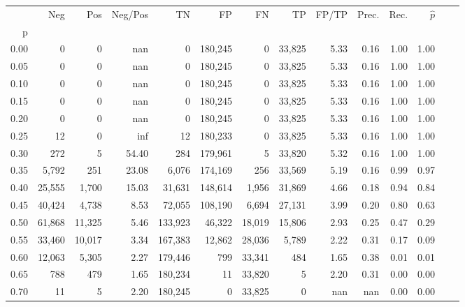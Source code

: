 \begin{tabular}{rrrrrrrrrrrrrr}
\toprule
{} &     Neg &     Pos & Neg/Pos &       TN &       FP &      FN &      TP & FP/TP & Prec. &  Rec. & $\hat{p}$ \\
p    &         &         &         &          &          &         &         &       &       &       &           \\
\midrule
0.00 &       0 &       0 &     nan &        0 &  180,245 &       0 &  33,825 &  5.33 &  0.16 &  1.00 &      1.00 \\
0.05 &       0 &       0 &     nan &        0 &  180,245 &       0 &  33,825 &  5.33 &  0.16 &  1.00 &      1.00 \\
0.10 &       0 &       0 &     nan &        0 &  180,245 &       0 &  33,825 &  5.33 &  0.16 &  1.00 &      1.00 \\
0.15 &       0 &       0 &     nan &        0 &  180,245 &       0 &  33,825 &  5.33 &  0.16 &  1.00 &      1.00 \\
0.20 &       0 &       0 &     nan &        0 &  180,245 &       0 &  33,825 &  5.33 &  0.16 &  1.00 &      1.00 \\
0.25 &      12 &       0 &     inf &       12 &  180,233 &       0 &  33,825 &  5.33 &  0.16 &  1.00 &      1.00 \\
0.30 &     272 &       5 &   54.40 &      284 &  179,961 &       5 &  33,820 &  5.32 &  0.16 &  1.00 &      1.00 \\
0.35 &   5,792 &     251 &   23.08 &    6,076 &  174,169 &     256 &  33,569 &  5.19 &  0.16 &  0.99 &      0.97 \\
0.40 &  25,555 &   1,700 &   15.03 &   31,631 &  148,614 &   1,956 &  31,869 &  4.66 &  0.18 &  0.94 &      0.84 \\
0.45 &  40,424 &   4,738 &    8.53 &   72,055 &  108,190 &   6,694 &  27,131 &  3.99 &  0.20 &  0.80 &      0.63 \\
0.50 &  61,868 &  11,325 &    5.46 &  133,923 &   46,322 &  18,019 &  15,806 &  2.93 &  0.25 &  0.47 &      0.29 \\
0.55 &  33,460 &  10,017 &    3.34 &  167,383 &   12,862 &  28,036 &   5,789 &  2.22 &  0.31 &  0.17 &      0.09 \\
0.60 &  12,063 &   5,305 &    2.27 &  179,446 &      799 &  33,341 &     484 &  1.65 &  0.38 &  0.01 &      0.01 \\
0.65 &     788 &     479 &    1.65 &  180,234 &       11 &  33,820 &       5 &  2.20 &  0.31 &  0.00 &      0.00 \\
0.70 &      11 &       5 &    2.20 &  180,245 &        0 &  33,825 &       0 &   nan &   nan &  0.00 &      0.00 \\

\end{tabular}
